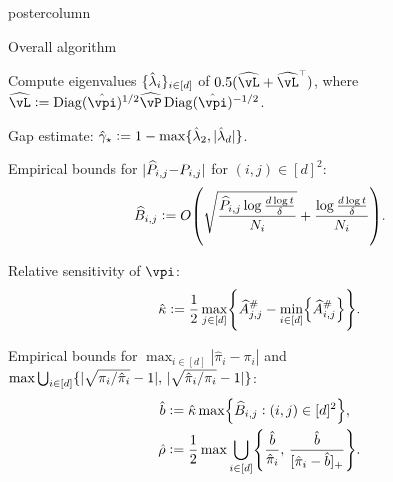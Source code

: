 \documentclass[notheorems,final]{beamer}
\newcommand\hatgap{\ensuremath{\hat{\gamma}_{\star}}}
\begin{document}
\begin{frame}{}
\begin{columns}
\begin{column}{0.24\textwidth}
\begin{beamercolorbox}[center,wd=\textwidth]{postercolumn}
\begin{minipage}[T]{.95\textwidth}
{\begin{block}{Overall algorithm}
\begin{algorithmic}[1]
                  \STATE Compute eigenvalues
                  $\{\hat\lambda_i\}_{i\in[d]}$ of
                  $0.5(\wh\vL+\wh\vL^\t)$, where $\wh\vL
                  := \Diag(\hat\vpi)^{1/2} \wh\vP \Diag(\hat\vpi)^{-1/2}$.

                  \STATE Gap estimate:
                    $\hatgap := 1 - \max\braces{ \hat\lambda_2,
                    |\hat\lambda_d| }$.

                  \STATE Empirical bounds for $|\widehat{P}_{i,j}{-}P_{i,j}|$ for $(i,j){\in}[d]^2$:
                  \begin{equation}
                    \wh{B}_{i,j}
                    :=
                    O\Parens{
                      \sqrt{\frac{\wh P_{i,j}\log\frac{d\log t}\delta}{N_i}}
                      + \frac{\log\frac{d\log t}\delta}{N_i}
                    }
                    .
                    \notag
                  \end{equation}

                  \STATE Relative sensitivity of $\vpi$:
                  \begin{equation}
                    \hat\kappa :=
                    \frac12
                    \max_{j\in[d]}
                    \Braces{
                      \wh{A}_{j,j}^\# - \min_{i\in[d]}\Braces{ \wh{A}_{i,j}^\# }
                    } 
                    .
                    \notag
                  \end{equation}

                  \STATE Empirical bounds for $\max_{i \in [d]} |\hat{\pi}_i -
                  \pi_i|$ and
                  $\max\bigcup_{i\in[d]}
                  \{
                    |\sqrt{\pi_i/\hat\pi_i}-1|,\,
                    |\sqrt{\hat\pi_i/\pi_i}-1|
                  \}$:
                  \begin{align*}
                    \hat{b}
                    & := \hat\kappa \max\Braces{
                      \wh{B}_{i,j}
                      : (i,j) \in [d]^2
                    }
                    , \\
                    \hat\rho
                    & := \frac12 \max \bigcup_{i\in[d]}
                    \Braces{
                      \frac{\hat{b}}{\hat\pi_i},\,
                      \frac{\hat{b}}{\brackets{\hat\pi_i-\hat{b}}_+}
                    }
                    .
                  \end{align*}


\end{algorithmic}
\end{block}}
\end{minipage}
\end{beamercolorbox}
\end{column}
\end{columns}
\end{frame}
\end{document}
